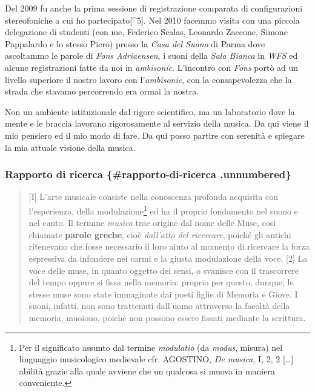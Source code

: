 \documentclass[a4paper,11pt]{article}
\begin{document}
Del 2009 fu anche la prima sessione di registrazione comparata di
configurazioni stereofoniche a cui ho partecipato{[}\^{}5{]}. Nel 2010 facemmo
visita con una piccola delegazione di studenti (con me, Federico Scalas,
Leonardo Zaccone, Simone Pappalardo e lo stesso Piero) presso la \emph{Casa
del Suono} di Parma dove ascoltammo le parole di \emph{Fons Adriaensen}, i
suoni della \emph{Sala Bianca} in \emph{WFS} ed alcune registrazioni fatte da noi
in \emph{ambisonic}. L'incontro con \emph{Fons} portò ad un livello superiore il
nostro lavoro con l'\emph{ambisonic}, con la consapevolezza che la strada che
stavamo percorrendo era ormai la nostra.

Non un ambiente istituzionale dal rigore scientifico, ma un laboratorio
dove la mente e le braccia lavorano rigorosamente al servizio della
musica. Da qui viene il mio pensiero ed il mio modo di fare. Da qui
posso partire con serenità e spiegare la mia attuale visione della
musica.



\subsubsection{Rapporto di ricerca \{\#rapporto-di-ricerca .unnumbered\}}\hypertarget{rapporto-di-ricerca-rapporto-di-ricerca-unnumbered}{}\label{rapporto-di-ricerca-rapporto-di-ricerca-unnumbered}

\begin{quote}
{[}I{]} L'arte musicale consiste nella conoscenza profonda acquisita con
l'esperienza, della modulazione\footnote{Per il significato assunto dal termine \emph{modulatio} (da \emph{modus},
misura) nel linguaggio musicologico medievale cfr. AGOSTINO, \emph{De
musica}, I, 2, 2 {[}\ldots{}{]} abilità grazie alla quale avviene che un
qualcosa si muova in maniera conveniente.} ed ha il proprio fondamento nel
suono e nel canto. Il termine \emph{musica} trae origine dal nome delle
Muse, così chiamate \textbf{parole greche}, cioè \emph{dall'atto del ricercare},
poiché gli antichi ritenevano che fosse necessario il loro aiuto al
momento di ricercare la forza espressiva da infondere nei carmi e la
giusta modulazione della voce. {[}2{]} La voce delle muse, in quanto
oggetto dei sensi, o svanisce con il trascorrere del tempo oppure si
fissa nella memoria: proprio per questo, dunque, le stesse muse sono
state immaginate dai poeti figlie di Memoria e Giove. I suoni,
infatti, non sono trattenuti dall'uomo attraverso la facoltà della
memoria, muoiono, poiché non possono essere fissati mediante la
scrittura.
\end{quote}
\end{document}
